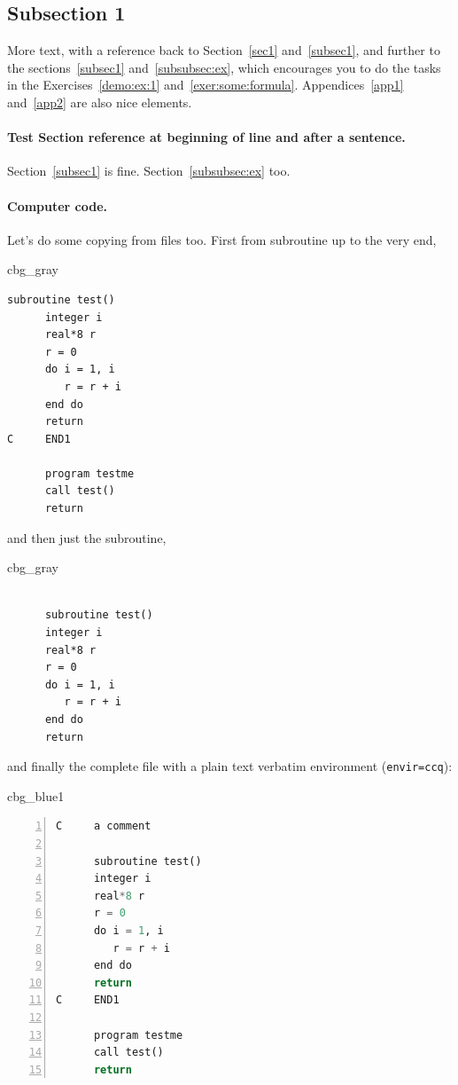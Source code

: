 \documentclass[%
oneside,                 %
final,                   %
10pt]{article}
\newenvironment{_cod_tight}[1]{
   \def\FrameCommand{\colorbox{#1}}
   \FrameRule0.6pt\MakeFramed {\FrameRestore}\vskip3mm}
   {\vskip0mm\endMakeFramed}
\newenvironment{cod}[1]{
\bgroup\rmfamily
\fboxsep=0mm\relax
\begin{_cod_tight}{#1}
\list{}{\parsep=-2mm\parskip=0mm\topsep=0pt\leftmargin=2mm
\rightmargin=2\leftmargin\leftmargin=4pt\relax}
\item\relax}
{\endlist\end{_cod_tight}\egroup}
\theoremstyle{definition}
\begin{document}
\subsection{Subsection 1}
\label{subsec1}
More text, with a reference back to
Section~\vref{sec1} and~\vref{subsec1}, and further to the
sections~\vref{subsec1} and~\vref{subsubsec:ex}, which
encourages you to do the tasks in the
Exercises~\vref{demo:ex:1} and~\vref{exer:some:formula}.
Appendices~\vref{app1} and~\vref{app2} are also nice elements.
\paragraph{Test Section reference at beginning of line and after a sentence.}
Section~\vref{subsec1} is fine.
Section~\vref{subsubsec:ex} too.
\paragraph{Computer code.}
Let's do some copying from files too. First from subroutine up to the very end,
\begin{cod}{cbg_gray}\begin{Verbatim}[numbers=none,fontsize=\fontsize{9pt}{9pt},baselinestretch=0.95,xleftmargin=2mm]
      subroutine test()
      integer i
      real*8 r
      r = 0
      do i = 1, i
         r = r + i
      end do
      return
C     END1

      program testme
      call test()
      return

\end{Verbatim}
\end{cod}
\noindent

and then just the subroutine,
\begin{cod}{cbg_gray}\begin{Verbatim}[numbers=none,fontsize=\fontsize{9pt}{9pt},baselinestretch=0.95,xleftmargin=2mm]

      subroutine test()
      integer i
      real*8 r
      r = 0
      do i = 1, i
         r = r + i
      end do
      return

\end{Verbatim}
\end{cod}
\noindent

and finally the complete file with a plain text verbatim environment
(\texttt{envir=ccq}):
\begin{cod}{cbg_blue1}\begin{lstlisting}[language=Python,style=myspeciallststyle,numbers=left,numberstyle=\tiny,stepnumber=3,numbersep=15pt,xleftmargin=1mm]
C     a comment

      subroutine test()
      integer i
      real*8 r
      r = 0
      do i = 1, i
         r = r + i
      end do
      return
C     END1

      program testme
      call test()
      return

\end{lstlisting}\end{cod}
\noindent
\end{document}
